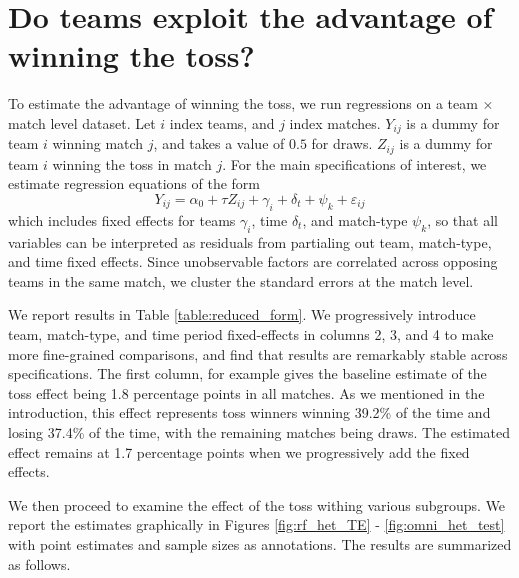 \documentclass[11pt,  letterpaper]{article}
\begin{document}


\section{Do teams exploit the advantage of winning the toss?}

To estimate the advantage of winning the toss, we run regressions on a team $\times$ match level dataset. Let $i$ index teams, and $j$ index matches. $Y_{ij}$ is a dummy for team $i$ winning match $j$, and takes a value of $0.5$ for draws. $Z_{ij}$ is a dummy for team $i$ winning the toss in match $j$. For the main specifications of interest, we estimate regression equations of the form
\begin{equation}\label{eqn:reduced_form}
Y_{ij} = \alpha_0 + \tau Z_{ij} + \gamma_i + \delta_t +
\psi_k + \varepsilon_{ij}
\end{equation}
which includes fixed effects for teams $\gamma_i$, time $\delta_t$, and match-type $\psi_k$, so that all variables can be interpreted as residuals from partialing out team, match-type, and time fixed effects. Since unobservable factors are correlated across opposing teams in the same match, we cluster the standard errors at the match level.

We report results in Table \ref{table:reduced_form}. We progressively introduce team, match-type, and time period fixed-effects in columns 2, 3, and 4 to make more fine-grained comparisons, and find that results are remarkably stable across specifications. The first column, for example gives
the baseline estimate of the toss effect being 1.8 percentage points in all matches. As we mentioned in the introduction, this effect represents toss winners winning 39.2\% of the time and losing 37.4\% of the time, with the remaining matches being draws. The estimated effect remains at 1.7 percentage points when we progressively add the fixed effects.

We then proceed to examine the effect of the toss withing various subgroups. We report the estimates graphically in Figures \ref{fig:rf_het_TE} - \ref{fig:omni_het_test} with point estimates and sample sizes as annotations. The results are summarized as follows.
\end{document}
